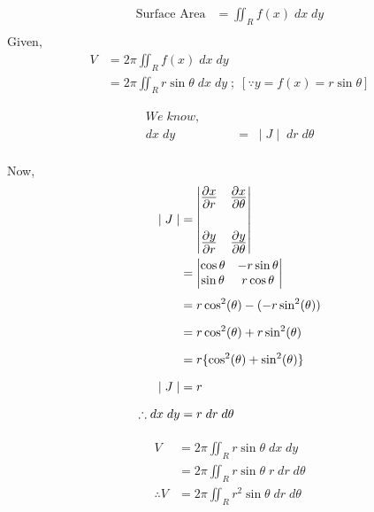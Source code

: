 \documentclass{article}
\begin{document}
\subsection{}%
\large{

\begin{align*}
    \text{Surface Area}	& = \iint_R f(x) \; dx \; dy \\
\end{align*}
Given,
\begin{align*}
V				& = 2 \pi \iint_R f(x) \; dx \; dy \\
				& = 2 \pi \iint_R r \sin \theta \; dx \; dy \; ; \; [\because y = f(x) = r \sin \theta]
\end{align*}

\begin{align*}
    We\;know, \quad\quad \\
    dx \; dy \; & = \; \mid J \mid \; dr \; d\theta \\
\end{align*}

Now,
\begin{align*}
    \mid J \mid
    & =
    \Large{
    \begin{vmatrix}
    \frac{\partial x}{\partial r} & \frac{\partial x}{\partial \theta} \\\\
    \frac{\partial y}{\partial r} & \frac{\partial y}{\partial \theta}
    \end{vmatrix}
    }\\
    & = 
    \begin{vmatrix}
    \cos \theta & -r \sin \theta \\
    \sin \theta & r \cos \theta
    \end{vmatrix} \\
    & = r \cos^2 (\theta) - (-r \sin^2 (\theta)) \\
    & = r \cos^2 (\theta) + r \sin^2 (\theta) \\
    & = r \{ \cos^2 (\theta) + \sin^2 (\theta) \} \\
    \mid J \mid
    & = r \\
    \therefore dx \; dy & = r \; dr \; d\theta
\end{align*}

\begin{align*}
    V				& = 2 \pi \iint_R r \sin \theta \; dx \; dy \\
                    & = 2 \pi \iint_R r \sin \theta \; r \; dr \; d\theta \\
    \therefore V	& = 2 \pi \iint_R r^2 \sin \theta \; dr \; d\theta \\
\end{align*}

}
\end{document}
